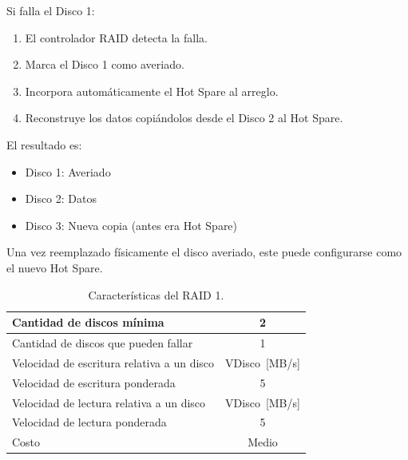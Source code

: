 Si falla el Disco 1:
\begin{enumerate}
  \item El controlador RAID detecta la falla.
  \item Marca el Disco 1 como averiado.
  \item Incorpora automáticamente el Hot Spare al arreglo.
  \item Reconstruye los datos copiándolos desde el Disco 2 al Hot Spare.
\end{enumerate}
El resultado es:
\begin{itemize}
  \item Disco 1: Averiado
  \item Disco 2: Datos
  \item Disco 3: Nueva copia (antes era Hot Spare)
\end{itemize}
Una vez reemplazado físicamente el disco averiado, este puede configurarse como el nuevo Hot Spare.

\begin{table}[!ht]
  \centering
  \begin{tabular}{l|c}
    Cantidad de discos mínima & 2 \\\hline
    Cantidad de discos que pueden fallar & 1 \\ \hline
    Velocidad de escritura relativa a un disco & VDisco~[MB/s] \\\hline
    Velocidad de escritura ponderada & 5 \\ \hline
    Velocidad de lectura relativa a un disco & VDisco~[MB/s] \\ \hline
    Velocidad de lectura ponderada & 5 \\ \hline
    Costo & Medio
  \end{tabular}
  \caption{Características del RAID 1.}
\end{table}
